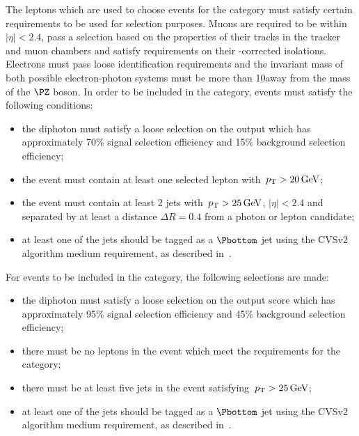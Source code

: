 The leptons which are used to choose events for the \TTHLeptonicTag category must satisfy certain requirements to be used for selection purposes. Muons are required to be within $|\eta|<2.4$, pass a selection based on the properties of their tracks in the tracker and muon chambers and satisfy requirements on their \PU-corrected isolations. Electrons must pass loose identification requirements and the invariant mass of both possible electron-photon systems must be more than 10\GeV away from the mass of the $\PZ$ boson. In order to be included in the \TTHLeptonicTag category, events must satisfy the following conditions:
\begin{itemize}
\item the diphoton must satisfy a loose selection on the \DiPhoBdt output which has approximately 70\% signal selection efficiency and 15\% background selection efficiency; 
\item the event must contain at least one selected lepton with $\,p_\text{T}>20\,\text{Ge\hspace{-.08em}V}$; %
\item the event must contain at least 2 jets with $\,p_\text{T}>25\,\text{Ge\hspace{-.08em}V}$, $|\eta|<2.4$ and separated by at least a distance $\Delta R=0.4$ from a photon or lepton candidate;
\item at least one of the jets should be tagged as a $\Pbottom$ jet using the CVSv2 algorithm medium requirement, as described in~\cite{bjets}.
\end{itemize}

For events to be included in the \TTHHadronicTag category, the following selections are made:
\begin{itemize}
\item the diphoton must satisfy a loose selection on the \DiPhoBdt output score which has approximately 95\% signal selection efficiency and 45\% background selection efficiency; 
\item there must be no leptons in the event which meet the requirements for the \TTHLeptonicTag category;
\item there must be at least five jets in the event satisfying $\,p_\text{T} >25\,\text{Ge\hspace{-.08em}V}$;
\item at least one of the jets should be tagged as a $\Pbottom$ jet using the CVSv2 algorithm medium requirement, as described in~\cite{bjets}.
\end{itemize}

